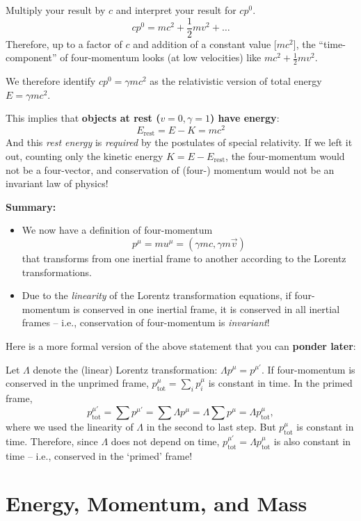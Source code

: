 \documentclass[11pt, letterpaper, openany]{book}
\begin{document}
Multiply your result by $c$ and interpret your result for $cp^0$.
\[ cp^0 = mc^2 + \frac{1}{2}mv^2 + \dots \]
Therefore, up to a factor of $c$ and addition of a constant value [$mc^2$], the ``time-component'' of four-momentum looks (at low velocities) like $mc^2 + \frac{1}{2}mv^2$.

We therefore identify $cp^0 = \gamma mc^2$ as the relativistic version of total energy $E = \gamma mc^2$.

This implies that \textbf{objects at rest ($v=0, \gamma=1$) have energy}:
\[ E_{\text{rest}} = E - K = mc^2 \]
And this \textit{rest energy} is \textit{required} by the postulates of special relativity. If we left it out, counting only the kinetic energy $K = E - E_{\text{rest}}$, the four-momentum would not be a four-vector, and conservation of (four-) momentum would not be an invariant law of physics!

\textbf{Summary:}
\begin{itemize}
    \item We now have a definition of four-momentum
    \[ p^\mu = mu^\mu = (\gamma mc, \gamma m\vec{v}) \]
    that transforms from one inertial frame to another according to the Lorentz transformations.
    \item Due to the \textit{linearity} of the Lorentz transformation equations, if four-momentum is conserved in one inertial frame, it is conserved in all inertial frames -- i.e., conservation of four-momentum is \textit{invariant}!
\end{itemize}

Here is a more formal version of the above statement that you can \textbf{ponder later}:

Let $\Lambda$ denote the (linear) Lorentz transformation: $\Lambda p^\mu = p^{\mu'}$. If four-momentum is conserved in the unprimed frame, $p^\mu_{\text{tot}} = \sum_i p^\mu_i$ is constant in time. In the primed frame,
\[ p^{\mu'}_{\text{tot}} = \sum p^{\mu'} = \sum \Lambda p^\mu = \Lambda \sum p^\mu = \Lambda p^\mu_{\text{tot}}, \]
where we used the linearity of $\Lambda$ in the second to last step. But $p^\mu_{\text{tot}}$ is constant in time. Therefore, since $\Lambda$ does not depend on time, $p^{\mu'}_{\text{tot}} = \Lambda p^\mu_{\text{tot}}$ is also constant in time -- i.e., conserved in the `primed' frame!

\chapter{Energy, Momentum, and Mass}
\end{document}
